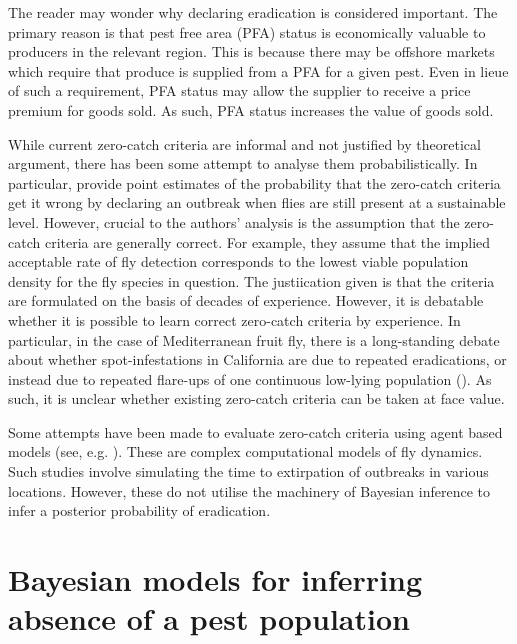 \documentclass[
  oneside]{book}
\begin{document}
The reader may wonder why declaring eradication is considered important. The primary reason is that pest free area (PFA) status is economically valuable to producers in the relevant region. This is because there may be offshore markets which require that produce is supplied from a PFA for a given pest. Even in lieue of such a requirement, PFA status may allow the supplier to receive a price premium for goods sold. As such, PFA status increases the value of goods sold.

While current zero-catch criteria are informal and not justified by theoretical argument, there has been some attempt to analyse them probabilistically. In particular, \citet{meats2005} provide point estimates of the probability that the zero-catch criteria get it wrong by declaring an outbreak when flies are still present at a sustainable level. However, crucial to the authors' analysis is the assumption that the zero-catch criteria are generally correct. For example, they assume that the implied acceptable rate of fly detection corresponds to the lowest viable population density for the fly species in question. The justiication given is that the criteria are formulated on the basis of decades of experience. However, it is debatable whether it is possible to learn correct zero-catch criteria by experience. In particular, in the case of Mediterranean fruit fly, there is a long-standing debate about whether spot-infestations in California are due to repeated eradications, or instead due to repeated flare-ups of one continuous low-lying population (\citet{carey2017}). As such, it is unclear whether existing zero-catch criteria can be taken at face value.

Some attempts have been made to evaluate zero-catch criteria using agent based models (see, e.g. \citet{collier2017}). These are complex computational models of fly dynamics. Such studies involve simulating the time to extirpation of outbreaks in various locations. However, these do not utilise the machinery of Bayesian inference to infer a posterior probability of eradication.

\hypertarget{bayesian-models-for-inferring-absence-of-a-pest-population}{%
\section{Bayesian models for inferring absence of a pest population}\label{bayesian-models-for-inferring-absence-of-a-pest-population}}
\end{document}
